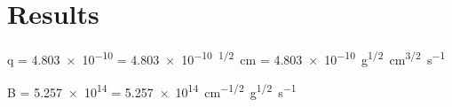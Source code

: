 \section{Results}
\label{sec:results}

q = \qty{4.803e-10}{\statcoulomb} = 
\qty{4.803e-10}{\dyne\tothe{1/2}\centi\meter} = 
\qty{4.803e-10}{\gram\tothe{1/2}\centi\meter\tothe{3/2}\per\second}

B = \qty{5.257e+14}{\gauss} = \qty{5.257e+14}{\centi\meter\tothe{-1/2}\gram\tothe{1/2}\per\second}

